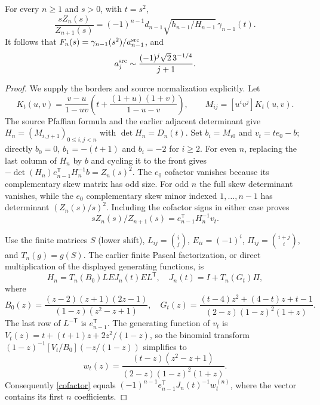 \begin{proposition}\label{prop:boundary}
For every $n\ge1$ and $s>0$, with $t=s^2$,
\begin{equation}\label{boundaryexact}
 \frac{sZ_n(s)}{Z_{n+1}(s)}
 =(-1)^{n-1}d_{n-1}\sqrt{h_{n-1}/H_{n-1}}\,\gamma_{n-1}(t).
\end{equation}
It follows that $F_n(s)=\gamma_{n-1}(s^2)/a_{n-1}^{\rm src}$, and
\begin{equation}\label{calcoefficient}
 a_j^{\rm src}\sim\frac{(-1)^j\sqrt2\,3^{-1/4}}{j+1}.
\end{equation}
\end{proposition}
\begin{proof}
We supply the borders and source normalization explicitly.
Let
\[
 K_t(u,v)=\frac{v-u}{1-uv}
       \left(t+\frac{(1+u)(1+v)}{1-u-v}\right),\qquad
 M_{ij}=[u^iv^j]K_t(u,v).
\]
The source Pfaffian formula \cite[Equation (4.1)]{bfk}
and the earlier adjacent determinant give
$H_n=(M_{i,j+1})_{0\le i,j<n}$ with $\det H_n=D_n(t)$.
Set $b_i=M_{i0}$ and $v_t=te_0-b$; directly
$b_0=0$, $b_1=-(t+1)$ and $b_i=-2$ for $i\ge2$.
For even $n$, replacing the last column of $H_n$ by $b$ and cycling
it to the front gives
$-\det(H_n)e_{n-1}^{\mathsf T}H_n^{-1}b=Z_n(s)^2$.
The $e_0$ cofactor vanishes because its complementary skew matrix
has odd size. For odd $n$ the full skew determinant vanishes, while
the $e_0$ complementary skew minor indexed $1,\ldots,n-1$ has
determinant $(Z_n(s)/s)^2$. Including the cofactor signs in either
case proves
\begin{equation}\label{cofactor}
 sZ_n(s)/Z_{n+1}(s)=e_{n-1}^{\mathsf T}H_n^{-1}v_t.
\end{equation}

Use the finite matrices $S$ (lower shift), $L_{ij}=\binom ij$,
$E_{ii}=(-1)^i$, $\Pi_{ij}=\binom{i+j}{i}$, and $T_n(g)=g(S)$.
The earlier finite Pascal factorization, or direct multiplication
of the displayed generating functions, is
\[
 H_n=T_n(B_0)LEJ_n(t)EL^{\mathsf T},\quad
 J_n(t)=I+T_n(G_t)\Pi,
\]
where
\[
 B_0(z)=\frac{(z-2)(z+1)(2z-1)}{(1-z)(z^2-z+1)},\quad
 G_t(z)=\frac{(t-4)z^2+(4-t)z+t-1}{(2-z)(1-z)^2(1+z)}.
\]
The last row of $L^{-\mathsf T}$ is $e_{n-1}^{\mathsf T}$.
The generating function of $v_t$ is $V_t(z)=t+(t+1)z+2z^2/(1-z)$,
so the binomial transform
$(1-z)^{-1}[V_t/B_0](-z/(1-z))$ simplifies to
\[
 w_t(z)=\frac{(t-z)(z^2-z+1)}{(2-z)(1-z)^2(1+z)}.
\]
Consequently \eqref{cofactor} equals
$(-1)^{n-1}e_{n-1}^{\mathsf T}J_n(t)^{-1}w_t^{(n)}$,
where the vector contains its first $n$ coefficients.


\end{proof}
